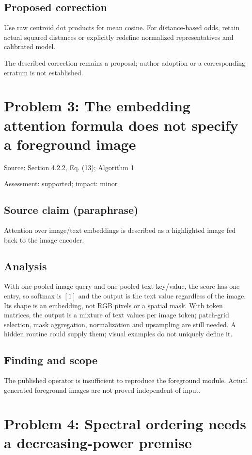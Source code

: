 \documentclass[11pt]{article}
\begin{document}
\subsection*{Proposed correction}

Use raw centroid dot products for mean cosine. For distance-based odds, retain actual squared distances or explicitly redefine normalized representatives and calibrated model.

The described correction remains a proposal; author adoption or a corresponding erratum is not established.

\section*{Problem 3: The embedding attention formula does not specify a foreground image}

Source: Section 4.2.2, Eq. (13); Algorithm 1

Assessment: supported; impact: minor

\subsection*{Source claim (paraphrase)}

Attention over image/text embeddings is described as a highlighted image fed back to the image encoder.

\subsection*{Analysis}

With one pooled image query and one pooled text key/value, the score has one entry, so softmax is \([1]\) and the output is the text value regardless of the image. Its shape is an embedding, not RGB pixels or a spatial mask. With token matrices, the output is a mixture of text values per image token; patch-grid selection, mask aggregation, normalization and upsampling are still needed. A hidden routine could supply them; visual examples do not uniquely define it.

\subsection*{Finding and scope}

The published operator is insufficient to reproduce the foreground module. Actual generated foreground images are not proved independent of input.

\section*{Problem 4: Spectral ordering needs a decreasing-power premise}
\end{document}
